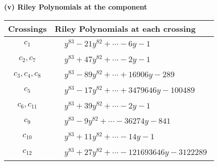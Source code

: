 \documentclass[1p]{elsarticle_modified}
\theoremstyle{definition}
\begin{document}
\newpage\renewcommand{\arraystretch}{1}
\flushleft \textbf{(v) Riley Polynomials at the component}\newline \\
\begin{tabular}{m{50pt}|m{274pt}}
Crossings & \hspace{64pt}Riley Polynomials at each crossing \\
\hline $$\begin{aligned}c_{1}\end{aligned}$$&$\begin{aligned}
&y^{83}-21 y^{82}+\cdots-6 y-1
\end{aligned}$\\
\hline $$\begin{aligned}c_{2},c_{7}\end{aligned}$$&$\begin{aligned}
&y^{83}+47 y^{82}+\cdots-2 y-1
\end{aligned}$\\
\hline $$\begin{aligned}c_{3},c_{4},c_{8}\end{aligned}$$&$\begin{aligned}
&y^{83}-89 y^{82}+\cdots+16906 y-289
\end{aligned}$\\
\hline $$\begin{aligned}c_{5}\end{aligned}$$&$\begin{aligned}
&y^{83}-17 y^{82}+\cdots+3479646 y-100489
\end{aligned}$\\
\hline $$\begin{aligned}c_{6},c_{11}\end{aligned}$$&$\begin{aligned}
&y^{83}+39 y^{82}+\cdots-2 y-1
\end{aligned}$\\
\hline $$\begin{aligned}c_{9}\end{aligned}$$&$\begin{aligned}
&y^{83}-9 y^{82}+\cdots-36274 y-841
\end{aligned}$\\
\hline $$\begin{aligned}c_{10}\end{aligned}$$&$\begin{aligned}
&y^{83}+11 y^{82}+\cdots-14 y-1
\end{aligned}$\\
\hline $$\begin{aligned}c_{12}\end{aligned}$$&$\begin{aligned}
&y^{83}+27 y^{82}+\cdots-121693646 y-3122289
\end{aligned}$\\
\hline
\end{tabular}\\~\\
\end{document}
